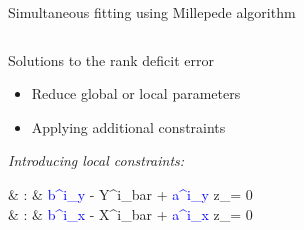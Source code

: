\documentclass{ikpKoeln}
\begin{document}
\begin{frame}[t]{Simultaneous fitting using Millepede algorithm}
\begin{columns}[t]
\begin{column}{0.48 \textwidth}
			\pause
			\vspace*{-1em}
			\begin{alertblock}{Solutions to the rank deficit error}
				\begin{itemize}
					\setlength\itemsep{0em}
					\item Reduce global or local parameters
					\item Applying additional constraints
				\end{itemize}
			\end{alertblock}
			\textit{Introducing local constraints:}
			\begin{flalign*}
				 & : & \textcolor{blue}{b^i_y} - Y^i_{bar} + \textcolor{blue}{a^i_y} \cdot z_\mu = 0 \\
				 & :   & \textcolor{blue}{b^i_x} - X^i_{bar} + \textcolor{blue}{a^i_x} \cdot z_\mu = 0
			\end{flalign*}
		\end{column}
	\end{columns}
\end{frame}
\end{document}
